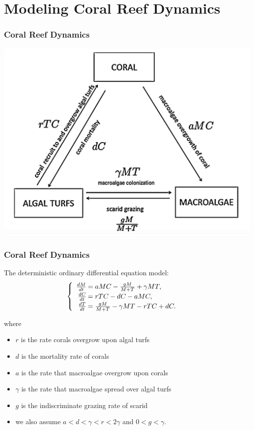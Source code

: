 \section{Modeling Coral Reef Dynamics}

\begin{frame}
\frametitle{Coral Reef Dynamics}
\includegraphics[scale=.175]{./coral-reef-triangle.png}\\ \cite{Hastings}
\end{frame}

\begin{frame}\frametitle{Coral Reef Dynamics}
The deterministic ordinary differential equation model:
$$\begin{cases}\begin{array}{rl}
\frac{dM}{dt}\hspace{-.8em}&=aMC - \frac{gM}{M+T} + \gamma M T, \\
\frac{dC}{dt}\hspace{-.8em}&=rTC - dC - aMC, \\
\frac{dT}{dt}\hspace{-.8em}&=\frac{gM}{M + T} - \gamma MT - rTC + dC. 
\end{array}\end{cases}$$ 

where 
\begin{itemize}\itemsep0pt
\item $r$ is the rate corals overgrow upon algal turfs\\
\item $d$ is the mortality rate of corals\\
\item $a$ is the rate that macroalgae overgrow upon corals\\
\item $\gamma$ is the rate that macroalgae spread over algal turfs\\
\item $g$ is the indiscriminate grazing rate of scarid\\
\item we also assume $a<d<\gamma<r<2\gamma$ and $0<g<\gamma$.
\end{itemize} \vspace{1em}
\cite{Hastings}
\end{frame}

